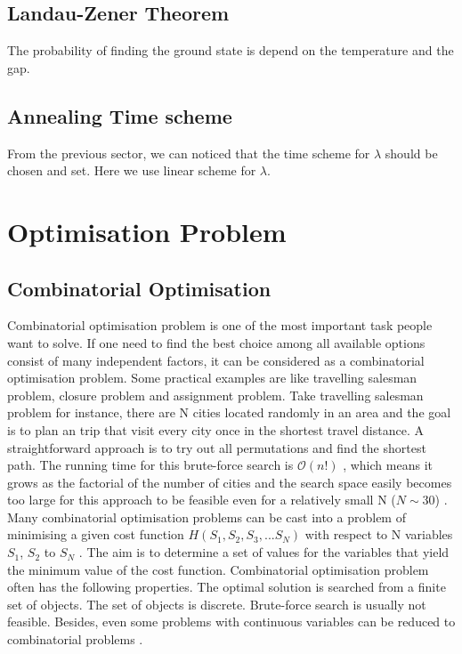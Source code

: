 \documentclass[twoside,a4paper,article]{combine}
\begin{document}
\subsection{Landau-Zener Theorem}
The probability of finding the ground state is depend on the temperature and the gap.

\subsection{Annealing Time scheme}
From the previous sector, we can noticed that the time scheme for $\lambda$ should be chosen and set. Here we use linear scheme for $\lambda$.


\section{Optimisation Problem}
\subsection{Combinatorial Optimisation}

Combinatorial optimisation problem is one of the most important task people want to solve. If one need to find the best choice among all available options consist of many independent factors, it can be considered as a combinatorial optimisation problem. Some practical examples are like travelling salesman problem, closure problem and assignment problem. Take travelling salesman problem for instance, there are N cities located randomly in an area and the goal is to plan an trip that visit every city once in the shortest travel distance. A straightforward approach is to try out all permutations and find the shortest path. The running time for this brute-force search is $\mathcal{O}(n!)$ , which means it grows as the factorial of the number of cities and the search space easily becomes too large for this approach to be feasible even for a relatively small N ($N \sim 30$) \cite{Santoro2006}. \\

Many combinatorial optimisation problems can be cast into a problem of minimising a given cost function $H(S_1,S_2,S_3,...S_N)$ with respect to N variables $S_1$, $S_2$ to $S_N$ \cite{Das2008}. The aim is to determine a set of values for the variables that yield the minimum value of the cost function. Combinatorial optimisation problem often has the following properties. The optimal solution is searched from a finite set of objects. The set of objects is discrete. Brute-force search is usually not feasible. Besides, even some problems with continuous variables can be reduced to combinatorial problems \cite{Papadimitriou1984}. \\
\end{document}
